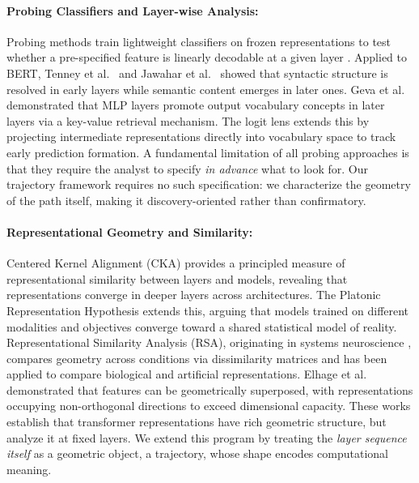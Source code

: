 \documentclass{article}
\begin{document}
\paragraph{Probing Classifiers and Layer-wise Analysis:} Probing methods train lightweight classifiers on frozen representations  to test whether a pre-specified feature is linearly decodable at a given layer \cite{alain2016understanding}. Applied to BERT, Tenney et al.\  \cite{tenney2019bert} and Jawahar et al.\ \cite{jawahar2019bert} showed that syntactic structure is resolved in early layers while semantic content emerges in later ones. Geva et al.\ \cite{geva2022transformer} demonstrated that MLP layers promote output vocabulary concepts in later layers via a key-value retrieval mechanism. The logit lens \cite{nostalgebraist2020logit} extends this by projecting intermediate representations directly into vocabulary space to track early prediction formation. A fundamental limitation of all probing approaches is that they require the analyst to specify \textit{in advance} what to look for. Our trajectory framework requires no such specification: we characterize the geometry of the path itself, making it discovery-oriented rather than confirmatory.

\paragraph{Representational Geometry and Similarity:} Centered Kernel Alignment (CKA) \cite{kornblith2019similarity} provides a principled measure of representational similarity between layers and models, revealing that representations converge in deeper layers across architectures. The Platonic Representation Hypothesis \cite{huh2024platonic} extends this, arguing that models trained on different modalities and objectives converge toward a shared statistical model of reality. Representational Similarity Analysis (RSA), originating in systems neuroscience \cite{kriegeskorte2008representational}, compares geometry across conditions via dissimilarity matrices and has been applied to compare biological and artificial representations. Elhage et al.\ \cite{elhage2022superposition} demonstrated that features can be geometrically superposed, with representations occupying non-orthogonal directions to exceed dimensional capacity. These works establish that transformer representations have rich geometric structure, but analyze it at fixed layers. We extend this program by treating the \textit{layer sequence itself} as a geometric object, a trajectory, whose shape encodes computational meaning.
\end{document}
